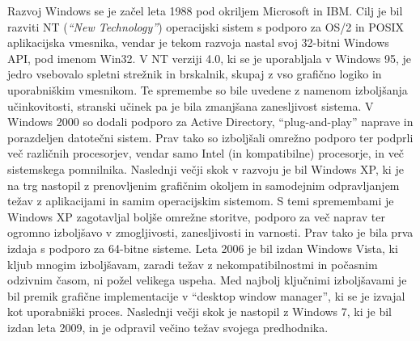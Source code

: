 \documentclass[a4paper,12pt,openright]{book}
\begin{document}
Razvoj Windows se je začel leta 1988 pod okriljem Microsoft in IBM. Cilj je bil razviti NT (\textit{``New Technology''}) operacijski sistem s podporo za OS/2 in POSIX aplikacijska vmesnika, vendar je tekom razvoja nastal svoj 32-bitni Windows API, pod imenom Win32.
V NT verziji 4.0, ki se je uporabljala v Windows 95, je jedro vsebovalo spletni strežnik in brskalnik, skupaj z vso grafično logiko in uporabniškim vmesnikom. Te spremembe so bile uvedene z namenom izboljšanja učinkovitosti, stranski učinek pa je bila zmanjšana zanesljivost sistema.
V Windows 2000 so dodali podporo za Active Directory, ``plug-and-play'' naprave in porazdeljen datotečni sistem. Prav tako so izboljšali omrežno podporo ter podprli več različnih procesorjev, vendar samo Intel (in kompatibilne) procesorje, in več sistemskega pomnilnika.
Naslednji večji skok v razvoju je bil Windows XP, ki je na trg nastopil z prenovljenim grafičnim okoljem in samodejnim odpravljanjem težav z aplikacijami in samim operacijskim sistemom.
S temi spremembami je Windows XP zagotavljal boljše omrežne storitve, podporo za več naprav ter ogromno izboljšavo v zmogljivosti, zanesljivosti in varnosti. Prav tako je bila prva izdaja s podporo za 64-bitne sisteme.
Leta 2006 je bil izdan Windows Vista, ki kljub mnogim izboljšavam, zaradi težav z nekompatibilnostmi in počasnim odzivnim časom, ni požel velikega uspeha. Med najbolj ključnimi izboljšavami je bil premik grafične implementacije v ``desktop window manager'', ki se je izvajal kot uporabniški proces.
Naslednji večji skok je nastopil z Windows 7, ki je bil izdan leta 2009, in je odpravil večino težav svojega predhodnika.
\cite{Silberschatz_Galvin_Gagne_2018}
\end{document}
